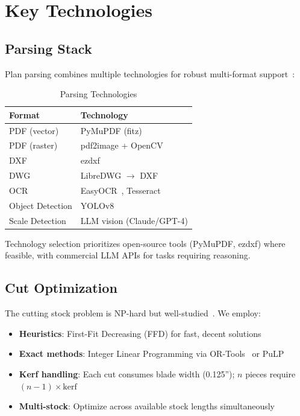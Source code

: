 
\section{Key Technologies}

\subsection{Parsing Stack}

Plan parsing combines multiple technologies for robust multi-format support~\cite{pizarro2022floorplan_survey}:

\begin{table}[ht]
\centering
\caption{Parsing Technologies}
\label{tab:parsing}
\begin{tabular}{ll}
\toprule
\textbf{Format} & \textbf{Technology} \\
\midrule
PDF (vector) & PyMuPDF (fitz)~\cite{pymupdf2024} \\
PDF (raster) & pdf2image + OpenCV \\
DXF & ezdxf~\cite{ezdxf2024} \\
DWG & LibreDWG $\rightarrow$ DXF \\
OCR & EasyOCR~\cite{easyocr2024}, Tesseract \\
Object Detection & YOLOv8~\cite{jocher2023yolov8} \\
Scale Detection & LLM vision (Claude/GPT-4) \\
\bottomrule
\end{tabular}
\end{table}

Technology selection prioritizes open-source tools (PyMuPDF, ezdxf) where feasible, with commercial LLM APIs for tasks requiring reasoning.

\subsection{Cut Optimization}

The cutting stock problem is NP-hard but well-studied~\cite{gilmore1961cutting, wascher2007csp_survey}. We employ:
\begin{itemize}
  \item \textbf{Heuristics}: First-Fit Decreasing (FFD) for fast, decent solutions
  \item \textbf{Exact methods}: Integer Linear Programming via OR-Tools~\cite{ortools2024} or PuLP
  \item \textbf{Kerf handling}: Each cut consumes blade width (0.125''); $n$ pieces require $(n-1) \times \text{kerf}$~\cite{cui2017lumber_optimization}
  \item \textbf{Multi-stock}: Optimize across available stock lengths simultaneously
\end{itemize}

